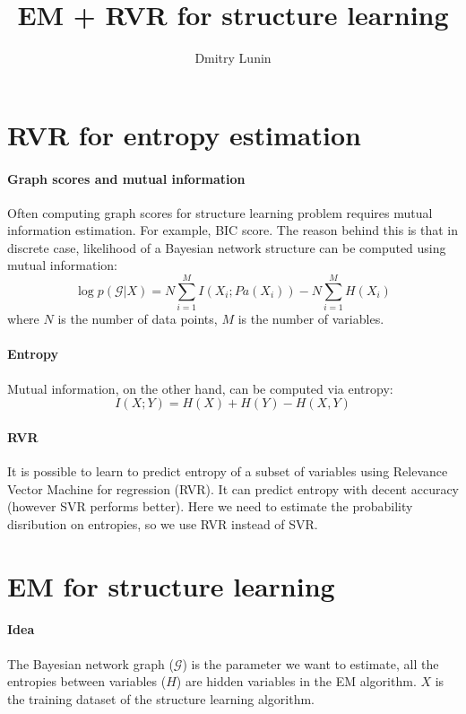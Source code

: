 \documentclass{article}
\author{Dmitry Lunin}
\title{EM + RVR for structure learning}
\newcommand{\graph}[1]{
	\mathcal{#1}
}
\begin{document}
\maketitle
	
\section{RVR for entropy estimation}
\paragraph{Graph scores and mutual information} Often computing graph scores for structure learning problem requires mutual information estimation. For example, BIC score. The reason behind this is that in discrete case, likelihood of a Bayesian network structure can be computed using mutual information:
\begin{equation}
	\log p(\graph{G}|X) = N \sum_{i=1}^M{I(X_i; Pa(X_i))} - N \sum_{i=1}^M{H(X_i)}  
\end{equation}
where $N$ is the number of data points, $M$ is the number of variables.
\paragraph{Entropy} 
Mutual information, on the other hand, can be computed via entropy:
\begin{equation}
	I(X; Y) = H(X) + H(Y) - H(X, Y)
\end{equation}

\paragraph{RVR} It is possible to learn to predict entropy of a subset of variables using Relevance Vector Machine for regression (RVR). It can predict entropy with decent accuracy (however SVR performs better). Here we need to estimate the probability disribution on entropies, so we use RVR instead of SVR.

\section{EM for structure learning}
\paragraph{Idea} The Bayesian network graph ($\graph{G}$) is the parameter we want to estimate, all the entropies between variables ($H$) are hidden variables in the EM algorithm.
$X$ is the training dataset of the structure learning algorithm.
\end{document}
